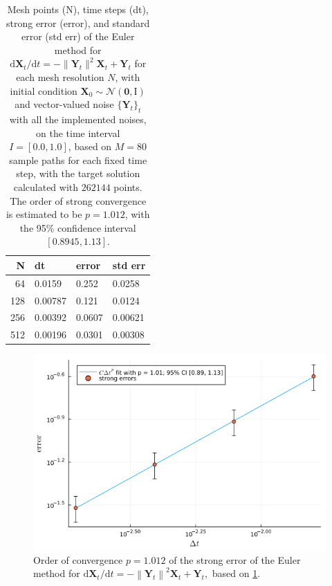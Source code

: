 \documentclass[reqno,12pt]{amsart}
\theoremstyle{plain} %
\theoremstyle{definition} %
\begin{document}
\begin{table}
    \begin{tabular}[htb]{|r|l|l|l|}
        \hline N & dt & error & std err \\
        \hline \hline
        64 & 0.0159 & 0.252 & 0.0258 \\
        128 & 0.00787 & 0.121 & 0.0124 \\
        256 & 0.00392 & 0.0607 & 0.00621 \\
        512 & 0.00196 & 0.0301 & 0.00308 \\
        \hline
    \end{tabular}
    \bigskip

    \caption{Mesh points (N), time steps (dt), strong error (error), and standard error (std err) of the Euler method for $\mathrm{d}\mathbf{X}_t/\mathrm{d}t = - \| \mathbf{Y}_t\|^2 \mathbf{X}_t + \mathbf{Y}_t$ for each mesh resolution $N$, with initial condition $\mathbf{X}_0 \sim \mathcal{N}(\mathbf{0}, \mathrm{I})$ and vector-valued noise $\{\mathbf{Y}_t\}_t$ with all the implemented noises, on the time interval $I = [0.0, 1.0]$, based on $M = 80$ sample paths for each fixed time step, with the target solution calculated with $262144$ points. The order of strong convergence is estimated to be $p = 1.012$, with the 95\% confidence interval $[0.8945, 1.13]$.}
    \label{taballnoises}
\end{table}

\begin{figure}[htb]
    \includegraphics[scale=0.6]{img/order_allnoises.png}
    \caption{Order of convergence $p = 1.012$ of the strong error of the Euler method for $\mathrm{d}\mathbf{X}_t/\mathrm{d}t = - \left\|\mathbf{Y}_t\right\|^2 \mathbf{X}_t + \mathbf{Y}_t,$ based on \cref{taballnoises}.}
    \label{figallnoises}
\end{figure}
\end{document}
